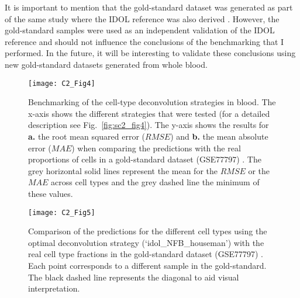 \bigskip

It is important to mention that the gold-standard dataset was generated as part of the same study where the IDOL reference was also derived \cite{Koestler2016}. However, the gold-standard samples were used as an independent validation of the IDOL reference and should not influence the conclusions of the benchmarking that I performed. In the future, it will be interesting to validate these conclusions using new gold-standard datasets generated from whole blood.

\bigskip


\begin{figure}[htbp!] 
	\centering    
	\texttt{[image: C2\_Fig4]}
	\caption[Benchmarking of the cell-type deconvolution strategies in blood: $RMSE$ and $MAE$]{Benchmarking of the cell-type deconvolution strategies in blood. The x-axis shows the different strategies that were tested (for a detailed description see Fig.~\ref{fig:sc2_fig4}). The y-axis shows the results for \textbf{a.} the root mean squared error ($RMSE$) and \textbf{b.} the mean absolute error ($MAE$) when comparing the predictions with the real proportions of cells in a gold-standard dataset (GSE77797) \cite{Koestler2016}. The grey horizontal solid lines represent the mean for the $RMSE$ or the $MAE$ across cell types and the grey dashed line the minimum of these values.}
	\label{fig:c2_fig4}
\end{figure}

\begin{figure}[htbp!] 
	\centering    
	\texttt{[image: C2\_Fig5]}
	\caption[Predictions obtained for each blood cell type using the optimal deconvolution strategy]{Comparison of the predictions for the different cell types using the optimal deconvolution strategy (`idol\_NFB\_houseman') with the real cell type fractions in the gold-standard dataset (GSE77797) \cite{Koestler2016}. Each point corresponds to a different sample in the gold-standard. The black dashed line represents the diagonal to aid visual interpretation.}
	\label{fig:c2_fig5}
\end{figure}


